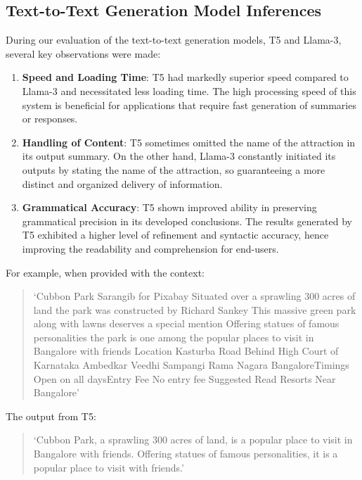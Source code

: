 \documentclass[conference]{IEEEtran}
\begin{document}
        \subsection{Text-to-Text Generation Model Inferences}

        During our evaluation of the text-to-text generation models, T5 and Llama-3, several key observations were made:

        \begin{enumerate}
            \item \textbf{Speed and Loading Time}:
            T5 had markedly superior speed compared to Llama-3 and necessitated less loading time. The high processing speed of this system is beneficial for applications that require fast generation of summaries or responses.

            \item \textbf{Handling of Content}:
            T5 sometimes omitted the name of the attraction in its output summary. On the other hand, Llama-3 constantly initiated its outputs by stating the name of the attraction, so guaranteeing a more distinct and organized delivery of information.

            \item \textbf{Grammatical Accuracy}:
            T5 shown improved ability in preserving grammatical precision in its developed conclusions. The results generated by T5 exhibited a higher level of refinement and syntactic accuracy, hence improving the readability and comprehension for end-users.

        \end{enumerate}

        For example, when provided with the context:
        \begin{quote}
        ‘Cubbon Park Sarangib for Pixabay Situated over a sprawling 300 acres of land the park was constructed by Richard Sankey This massive green park along with lawns deserves a special mention Offering statues of famous personalities the park is one among the popular places to visit in Bangalore with friends Location Kasturba Road Behind High Court of Karnataka Ambedkar Veedhi Sampangi Rama Nagara BangaloreTimings Open on all daysEntry Fee No entry fee Suggested Read Resorts Near Bangalore’
        \end{quote}

        The output from T5:
        \begin{quote}
        ‘Cubbon Park, a sprawling 300 acres of land, is a popular place to visit in Bangalore with friends. Offering statues of famous personalities, it is a popular place to visit with friends.’
        \end{quote}
\end{document}
